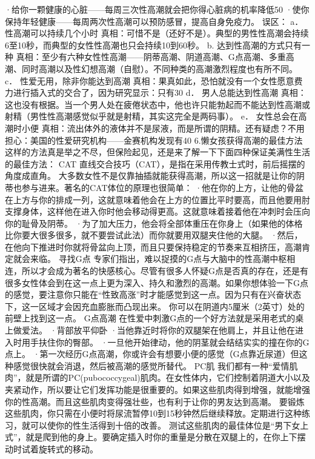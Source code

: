 \documentclass[12pt,UTF8]{ctexbook}
\begin{document}
·给你一颗健康的心脏——每周三次性高潮就会把你得心脏病的机率降低50%
·使你保持年轻健康——每周两次性高潮可以预防感冒，提高自身免疫力。
误区：
a． 性高潮可以持续几个小时
真相：可惜不是（还好不是）。典型的男性性高潮会持续6至10秒，而典型的女性性高潮也只会持续10到60秒。
b. 达到性高潮的方式只有一种
真相：至少有六种女性性高潮——阴蒂高潮、阴道高潮、G点高潮、多重高潮、同时高潮以及性幻想高潮（自慰）。不同种类的高潮激烈程度也有所不同。
c． 性爱无用，除非你能达到高潮
真相：果真如此，恐怕就没有一个女性愿意费力进行插入式的交合了，因为研究显示：只有30%
d． 男人总能达到性高潮
真相：这也没有根据。当一个男人处在疲倦状态中，他也许只能勃起而不能达到性高潮或射精（男性性高潮感觉似乎就是射精，其实这完全是两码事）。
e． 女性总会在高潮时小便
真相：流出体外的液体并不是尿液，而是所谓的阴精。还有疑虑？不用担心：美国的性爱研究机构——金赛机构发现有40%
6.懒女孩获得高潮的最佳方法
这样的方法真是举之不尽，但保险起见，还是来了解一下下面四种保证美满性生活的最佳方法：
CAT
直线交合技巧（CAT），是指在采用传教士式时，前后摇摆的角度成直角。
大多数女性不是仅靠抽插就能获得高潮，所以这一招就是让你的阴蒂也参与进来。著名的CAT体位的原理也很简单：
·他在你的上方，让他的骨盆在上方与你的排成一列，这就意味着他会在上方的位置比平时要高，而且他要用肘支撑身体，这样他在进入你时他会移动得更高。这就意味着接着他在冲刺时会压向你的耻骨及阴蒂。
·为了加大压力，他会将全部体重压在你身上（如果他的体格比你要大很多很多，就不要尝试此法）而你就要用双腿夹住他的大腿。
·然后，在他向下推进时你就将骨盆向上顶，而且只要保持稳定的节奏来互相挤压，高潮肯定就会来临。
寻找G点
专家们指出，难以捉摸的G点与大脑中的性高潮中枢相连，所以才会成为著名的快感核心。尽管有很多人怀疑G点是否真的存在，还是有很多女性体会到在这一点上更为深入、持久和激烈的高潮。如果你想体验一下G点的感觉，要注意你只能在“性致高涨”时才能感觉到这一点。因为只有在兴奋状态下，这一区域才会因充血膨胀而凸现出来。
你可以在阴道内5厘米（2英寸）处的前壁上找到这一点。
G点高潮
在性爱中刺激G点的一个好方法就是采用老式的桌上做爱法。
·背部放平仰卧
·当他靠近时将你的双腿架在他肩上，并且让他在进入时用手扶住你的臀部。
·一旦他开始律动，他的阴茎就会结结实实的撞在你的G点上。
·第一次经历G点高潮，你或许会有想要小便的感觉（G点靠近尿道）但这种感觉很快就会消退，然后被高潮的感觉所替代。
PC肌
我们都有一种“爱情肌肉”，就是所谓的PC(pubococcygeal)肌肉。在女性体内，它们控制着阴道大小以及夹紧动作，所以要让它们发挥功能是很重要的。如果这些肌肉得到增强，就能增强你的性高潮。而且这些肌肉变得强壮些，也有利于让你的男友达到高潮。
要锻炼这些肌肉，你只需在小便时将尿流暂停10到15秒钟然后继续释放。定期进行这种练习，就可以使你的性生活得到十倍的改善。
测试这些肌肉的最佳体位是“男下女上式”，就是爬到他的身上。要确定插入时你的重量是分散在双腿上的，在你上下摆动时试着旋转式的移动。
\end{document}
